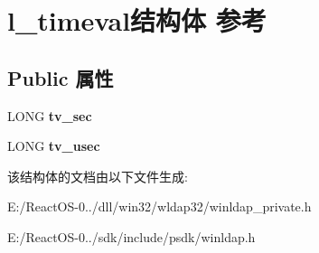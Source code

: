 \hypertarget{structl__timeval}{}\section{l\+\_\+timeval结构体 参考}
\label{structl__timeval}
\subsection*{Public 属性}
\begin{DoxyCompactItemize}
\item 
\mbox{\label{structl__timeval_a688fdd882e2598673916d8abfc83c649}} 
L\+O\+NG {\bfseries tv\+\_\+sec}
\item 
\mbox{\label{structl__timeval_ab8190b4ac3f3d257cff47d11b095e995}} 
L\+O\+NG {\bfseries tv\+\_\+usec}
\end{DoxyCompactItemize}


该结构体的文档由以下文件生成\+:\begin{DoxyCompactItemize}
\item 
E\+:/\+React\+O\+S-\/0../dll/win32/wldap32/winldap\+\_\+private.\+h\item 
E\+:/\+React\+O\+S-\/0../sdk/include/psdk/winldap.\+h\end{DoxyCompactItemize}
